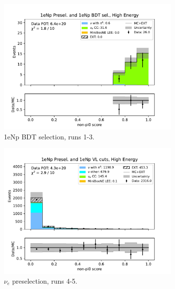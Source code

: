 \begin{figure}[H]
\begin{subfigure}{0.33\linewidth}
    \includegraphics[width=\linewidth]{technote/Sidebands/Figures/FarSideband/far_sideband_nonpi0_score_run123_NP_NPBDT_HIGH_ENERGY.pdf}
    \caption{1eNp BDT selection, runs 1-3.}
    \end{subfigure}
    \begin{subfigure}{0.33\linewidth}
    \includegraphics[width=\linewidth]{technote/Sidebands/Figures/FarSideband/far_sideband_nonpi0_score_run4b4c4d5_NP_NP_HIGH_ENERGY.pdf}
    \caption{$\nu_e$ preselection, runs 4-5.}
    \end{subfigure}%
    \begin{subfigure}{0.33\linewidth}

\end{subfigure}
\end{figure}

